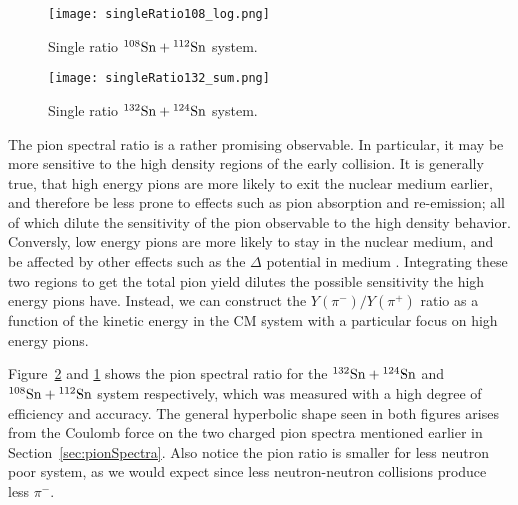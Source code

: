 \begin{comment}

\begin{figure}[!htb]
\centering
\texttt{[image: singleRatio.png]}
\caption{Single ratio spectra}
\label{fig:SRspectra}
\end{figure}
\end{comment}


\begin{figure}[!htb]
\centering
\texttt{[image: singleRatio108\_log.png]}
\caption{Single ratio ${}^{108}\mathrm{Sn} + {}^{112}\mathrm{Sn}$ system.}
\label{fig:SRsn108}
\end{figure}

\begin{figure}[!htb]
\centering
\texttt{[image: singleRatio132\_sum.png]}
\caption{Single ratio ${}^{132}\mathrm{Sn} + {}^{124}\mathrm{Sn}$ system.}
\label{fig:SRsn132}
\end{figure}

The pion spectral ratio is a rather promising observable. In particular, it may be more sensitive to the high density regions of the early collision. It is generally true, that high energy pions are more likely to exit the nuclear medium  earlier, and therefore be less prone to effects such as pion absorption and re-emission; all of which dilute the sensitivity of the pion observable to the high density behavior. Conversly, low energy pions are more likely to stay in the nuclear medium, and be affected by other effects such as the $\Delta$ potential in medium \cite{baoan_deltapotential}. Integrating these two regions to get the total pion yield dilutes the possible sensitivity the high energy pions have. Instead, we can construct the $Y(\pi^-)/Y(\pi^+)$ ratio as a function of the kinetic energy in the CM system with a particular focus on high energy pions.


Figure~\ref{fig:SRsn132} and \ref{fig:SRsn108} shows the pion spectral ratio for the ${}^{132}\mathrm{Sn} + {}^{124}\mathrm{Sn}$ and ${}^{108}\mathrm{Sn} + {}^{112}\mathrm{Sn}$ system respectively, which was measured with a high degree of efficiency and accuracy. The general hyperbolic shape seen in both figures arises from the Coulomb force on the two charged pion spectra mentioned earlier in Section~\ref{sec:pionSpectra}. Also notice the pion ratio is smaller for less neutron poor system, as we would expect since less neutron-neutron collisions produce less $\pi^-$. 



